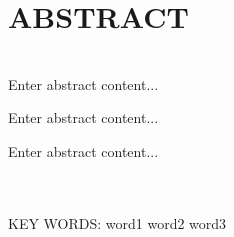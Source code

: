 \hei{}\noindent\begin{center}
    \\
\end{center}

~\\~\\

\section{ ABSTRACT}
{
    ~\\
    
    Enter abstract content...
            
    Enter abstract content...

    Enter abstract content...
        

    ~\\~\\
    \noindent
    KEY WORDS: word1 word2 word3
        
}
\thispagestyle{empty}